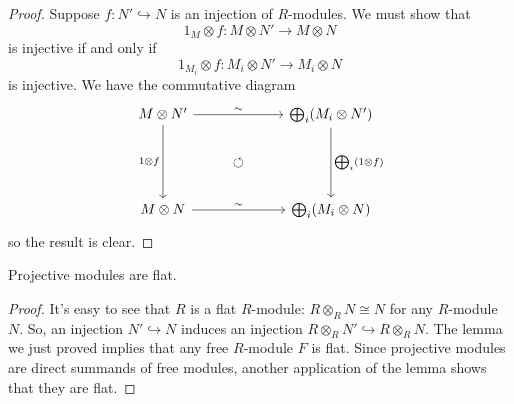 \begin{proof}
    Suppose $f:N' \hookrightarrow N$ is an injection of $R$-modules. We must show that
    $$1_M \otimes f : M \otimes N' \to M \otimes N$$
    is injective if and only if
    $$1_{M_i}\otimes f :M_i \otimes N' \to M_i \otimes N$$
    is injective. We have the commutative diagram
\[\begin{tikzcd}[ampersand replacement=\&]
	{M \otimes N'} \&\& {\bigoplus _i (M_i \otimes N')} \\
	\& \circlearrowleft \\
	{M \otimes N} \&\& {\bigoplus _i (M_i \otimes N)}
	\arrow["\sim", from=1-1, to=1-3]
	\arrow["{1 \otimes f}"', from=1-1, to=3-1]
	\arrow["{\bigoplus _i(1 \otimes f)}", from=1-3, to=3-3]
	\arrow["\sim", from=3-1, to=3-3]
\end{tikzcd}\]
so the result is clear.
\end{proof}

\begin{cor}
    Projective modules are flat.
\end{cor}

\begin{proof}
    It's easy to see that $R$ is a flat $R$-module: $R \otimes _RN \cong N$ for any $R$-module $N$. So, an injection $N' \hookrightarrow N$ induces an injection $R \otimes _RN' \hookrightarrow R \otimes _RN$. The lemma we just proved implies that any free $R$-module $F$ is flat. Since projective modules are direct summands of free modules, another application of the lemma shows that they are flat.
\end{proof}
